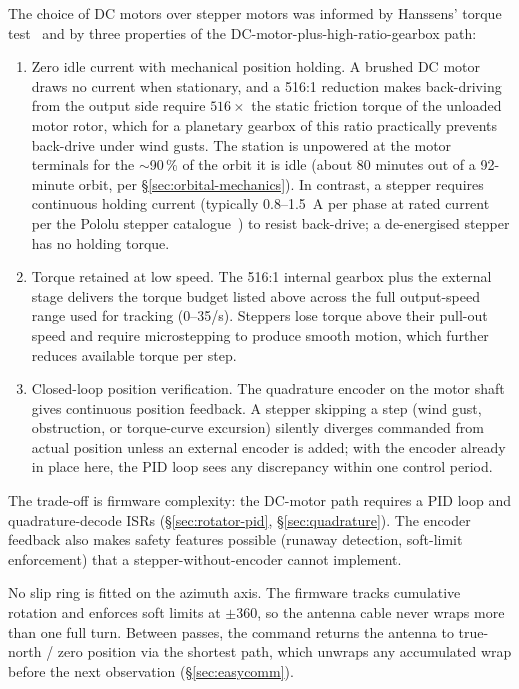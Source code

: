 The choice of DC motors over stepper motors was informed by Hanssens' torque test~\cite{hanssens2023} and by three properties of the DC-motor-plus-high-ratio-gearbox path:

\begin{enumerate}
    \item Zero idle current with mechanical position holding. A brushed DC motor draws no current when stationary, and a 516:1 reduction makes back-driving from the output side require $516\times$ the static friction torque of the unloaded motor rotor, which for a planetary gearbox of this ratio practically prevents back-drive under wind gusts. The station is unpowered at the motor terminals for the $\sim$90\,\% of the orbit it is idle (about 80 minutes out of a 92-minute orbit, per \S\ref{sec:orbital-mechanics}). In contrast, a stepper requires continuous holding current (typically 0.8--1.5~A per phase at rated current per the Pololu stepper catalogue~\cite{pololu-stepper}) to resist back-drive; a de-energised stepper has no holding torque.
    \item Torque retained at low speed. The 516:1 internal gearbox plus the external stage delivers the torque budget listed above across the full output-speed range used for tracking (0--35\degree/s). Steppers lose torque above their pull-out speed and require microstepping to produce smooth motion, which further reduces available torque per step.
    \item Closed-loop position verification. The quadrature encoder on the motor shaft gives continuous position feedback. A stepper skipping a step (wind gust, obstruction, or torque-curve excursion) silently diverges commanded from actual position unless an external encoder is added; with the encoder already in place here, the PID loop sees any discrepancy within one control period.
\end{enumerate}

The trade-off is firmware complexity: the DC-motor path requires a PID loop and quadrature-decode ISRs (\S\ref{sec:rotator-pid}, \S\ref{sec:quadrature}). The encoder feedback also makes safety features possible (runaway detection, soft-limit enforcement) that a stepper-without-encoder cannot implement.

No slip ring is fitted on the azimuth axis. The firmware tracks cumulative rotation and enforces soft limits at $\pm$360\degree, so the antenna cable never wraps more than one full turn. Between passes, the  command returns the antenna to true-north / zero position via the shortest path, which unwraps any accumulated wrap before the next observation (\S\ref{sec:easycomm}).

